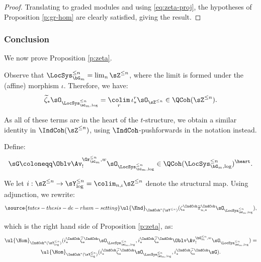 \begin{proof}

Translating to graded modules and using \eqref{eq:zeta-proj},
the hypotheses of Proposition \ref{p:gr-hom} are clearly satisfied, giving the result.

\end{proof}

\subsubsection{Conclusion}\label{ss:zeta-pf}

We now prove Proposition \ref{p:zeta}.

Observe that $\LocSys_{\bG_m}^{\leq n} = \lim_n \sZ^{\leq n}$, where the limit
is formed under the (affine) morphism $\iota$. Therefore, we have:
%
\[
\widetilde{\zeta}_*\sO_{\LocSys_{\bG_m,\log}^{\leq n}} =
\underset{r}{\colim} \, \iota_*^r \sO_{\sZ^{\leq n}} \in \QCoh(\sZ^{\leq n}).
\]

 As all of these terms are in the heart of the $t$-structure,
we obtain a similar identity in $\IndCoh(\sZ^{\leq n})$, using $\IndCoh$-pushforwards
in the notation instead.

Define:
%
\[
\sG \coloneqq \Oblv\Av_!^{\Gr_{\bG_m}^{\leq n},w}
\sO_{\LocSys_{\bG_m,\log}^{\leq n}} \in
\QCoh(\LocSys_{\bG_m,\log}^{\leq n})^{\heart}.
\]

We let $i:\sZ^{\leq n} \to \sY_{\log}^{\leq n} = \colim_{n,\iota} \sZ^{\leq n}$
denote the structural map. Using adjunction, we rewrite:
%
\begin{equation}\label{eq:zeta-rhs}
\source{tates-thesis-de-rham-setting}
\ul{\End}_{\IndCoh^*(\sY^{\leq n})}
(\zeta_*^{\IndCoh}\widetilde{\pi}_{n,*}^{\IndCoh}
\sO_{\LocSys_{\bG_m,\log}^{\leq n}}),
\end{equation}

 which is the right hand side of Proposition \ref{p:zeta}, as:
%
\[
\begin{gathered}
\ul{\Hom}_{\IndCoh^*(\sY_{\log}^{\leq n})}
(i_*^{\IndCoh}\widetilde{\zeta}_*^{\,\IndCoh}\sO_{\LocSys_{\bG_m,\log}^{\leq n}},
i_*^{\IndCoh}\widetilde{\zeta}_*^{\,\IndCoh}\Oblv\Av_!^{\bG_m^{\leq n},w}\sO_{\LocSys_{\bG_m,\log}^{\leq n}}) = \\
\ul{\Hom}_{\IndCoh^*(\sY_{\log}^{\leq n})}
(i_*^{\IndCoh}\widetilde{\zeta}_*^{\,\IndCoh}\sO_{\LocSys_{\bG_m,\log}^{\leq n}},
i_*^{\IndCoh}\widetilde{\zeta}_*^{\,\IndCoh}\sG).
\end{gathered}
\]

